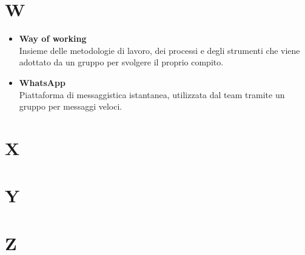 \documentclass[a4paper,12pt]{article}
\begin{document}
        \section*{W} {
            \begin{itemize}
                \item \textbf{Way of working}\\
                    Insieme delle metodologie di lavoro, dei processi e degli strumenti che viene adottato da un gruppo per svolgere il proprio compito.
                \item \textbf{WhatsApp}\\
                    Piattaforma di messaggistica istantanea, utilizzata dal team tramite un gruppo per messaggi veloci.
            \end{itemize}
        }
        \newpage

        \section*{X} {
            
        }
        \newpage

        \section*{Y} {
            
        }
        \newpage

        \section*{Z} {
            
        }
\end{document}
